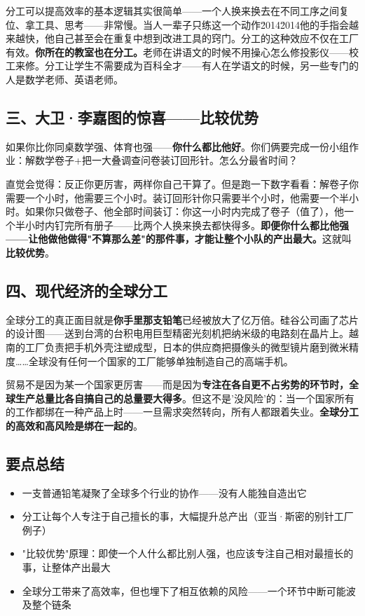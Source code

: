 \documentclass[a4paper,12pt]{ctexart}
\begin{document}
分工可以提高效率的基本逻辑其实很简单——一个人换来换去在不同工序之间复位、拿工具、思考——非常慢。当人一辈子只练这一个动作\u2014\u2014他的手指会越来越快，他自己甚至会在重复中想到改进工具的窍门。分工的这种效应不仅在工厂有效。\textbf{你所在的教室也在分工。}老师在讲语文的时候不用操心怎么修投影仪——校工来修。分工让学生不需要成为百科全才——有人在学语文的时候，另一些专门的人是数学老师、英语老师。

\subsection*{三、大卫·李嘉图的惊喜——比较优势}

如果你比你同桌数学强、体育也强——\textbf{你什么都比他好}。你们俩要完成一份小组作业：解数学卷子+把一大叠调查问卷装订回形针。怎么分最省时间？

直觉会觉得：反正你更厉害，两样你自己干算了。但是跑一下数字看看：解卷子你需要一个小时，他需要三个小时。装订回形针你只需要半个小时，他需要一个半小时。如果你只做卷子、他全部时间装订：你这一小时内完成了卷子（值了），他一个半小时内钉完所有册子——比两个人换来换去都快得多。\textbf{即便你什么都比他强——让他做他做得"不算那么差"的那件事，才能让整个小队的产出最大。}这就叫\textbf{比较优势}。

\subsection*{四、现代经济的全球分工}

全球分工的真正面目就是\textbf{你手里那支铅笔}已经被放大了亿万倍。硅谷公司画了芯片的设计图——送到台湾的台积电用巨型精密光刻机把纳米级的电路刻在晶片上。越南的工厂负责把手机外壳注塑成型，日本的供应商把摄像头的微型镜片磨到微米精度……全球没有任何一个国家的工厂能够单独制造自己的高端手机。

贸易不是因为某一个国家更厉害——而是因为\textbf{专注在各自更不占劣势的环节时，全球生产总量比各自搞自己的总量要大得多}。但这不是'没风险'的：当一个国家所有的工作都绑在一种产品上时——一旦需求突然转向，所有人都跟着失业。\textbf{全球分工的高效和高风险是绑在一起的}。

\subsection*{要点总结}
\begin{itemize}
  \item 一支普通铅笔凝聚了全球多个行业的协作——没有人能独自造出它
  \item 分工让每个人专注于自己擅长的事，大幅提升总产出（亚当·斯密的别针工厂例子）
  \item "比较优势"原理：即使一个人什么都比别人强，也应该专注自己相对最擅长的事，让整体产出最大
  \item 全球分工带来了高效率，但也埋下了相互依赖的风险——一个环节中断可能波及整个链条
\end{itemize}
\end{document}
